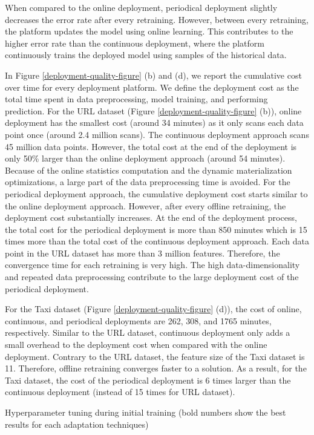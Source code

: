 When compared to the online deployment, periodical deployment slightly decreases the error rate after every retraining.
However, between every retraining, the platform updates the model using online learning.
This contributes to the higher error rate than the continuous deployment, where the platform continuously trains the deployed model using samples of the historical data.

In Figure \ref{deployment-quality-figure} (b) and (d), we report the cumulative cost over time for every deployment platform.
We define the deployment cost as the total time spent in data preprocessing, model training, and performing prediction.
For the URL dataset (Figure \ref{deployment-quality-figure} (b)), online deployment has the smallest cost (around 34 minutes) as it only scans each data point once (around 2.4 million scans).  
The continuous deployment approach scans 45 million data points.
However, the total cost at the end of the deployment is only 50\% larger than the online deployment approach (around 54 minutes).  
Because of the online statistics computation and the dynamic materialization optimizations, a large part of the data preprocessing time is avoided.
For the periodical deployment approach, the cumulative deployment cost starts similar to the online deployment approach.
However, after every offline retraining, the deployment cost substantially increases.
At the end of the deployment process, the total cost for the periodical deployment is more than 850 minutes which is 15 times more than the total cost of the continuous deployment approach.
Each data point in the URL dataset has more than 3 million features.
Therefore, the convergence time for each retraining is very high.
The high data-dimensionality and repeated data preprocessing contribute to the large deployment cost of the periodical deployment.

For the Taxi dataset (Figure \ref{deployment-quality-figure} (d)), the cost of online, continuous, and periodical deployments are 262, 308, and 1765 minutes, respectively.
Similar to the URL dataset, continuous deployment only adds a small overhead to the deployment cost when compared with the online deployment.
Contrary to the URL dataset, the feature size of the Taxi dataset is 11.
Therefore, offline retraining converges faster to a solution.
As a result, for the Taxi dataset, the cost of the periodical deployment is 6 times larger than the continuous deployment (instead of 15 times for URL dataset). 
\begin{table*}[t]
\centering
\begin{adjustbox}{max width=\textwidth}

\end{adjustbox}
\caption{Hyperparameter tuning during initial training (bold numbers show the best results for each adaptation techniques)}
 \vspace{-25pt}
\label{hyper-param-table}
\end{table*}
